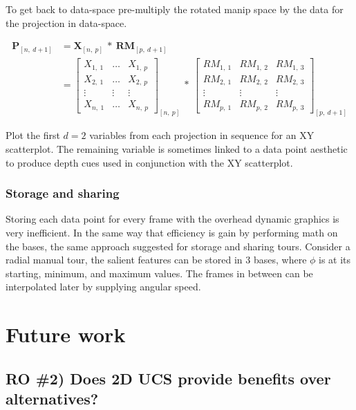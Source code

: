 \documentclass{monashthesis}
\begin{document}
To get back to data-space pre-multiply the rotated manip space by the
data for the projection in data-space.

\begin{align}
  \textbf{P}_{[n,~d+1]}
    &= \textbf{X}_{[n,~p]} ~*~ \textbf{RM}_{[p,~d+1]} \\
    &=
      \begin{bmatrix}
          X_{1,~1} & \dots & X_{1,~p} \\
          X_{2,~1} & \dots & X_{2,~p} \\
          \vdots   & \vdots & \vdots  \\
          X_{n,~1} & \dots & X_{n,~p}
      \end{bmatrix}_{[n,~p]}
      ~*~
      \begin{bmatrix}
        RM_{1,~1} & RM_{1,~2} & RM_{1,~3} \\
        RM_{2,~1} & RM_{2,~2} & RM_{2,~3} \\
        \vdots    & \vdots    & \vdots    \\
        RM_{p,~1} & RM_{p,~2} & RM_{p,~3}
      \end{bmatrix}_{[p,~d+1]}
\end{align}

Plot the first \(d=2\) variables from each projection in sequence for an
XY scatterplot. The remaining variable is sometimes linked to a data
point aesthetic to produce depth cues used in conjunction with the XY
scatterplot.

\subsection{Storage and sharing}\label{storage-and-sharing}

Storing each data point for every frame with the overhead dynamic
graphics is very inefficient. In the same way that efficiency is gain by
performing math on the bases, the same approach suggested for storage
and sharing tours. Consider a radial manual tour, the salient features
can be stored in 3 bases, where \(\phi\) is at its starting, minimum,
and maximum values. The frames in between can be interpolated later by
supplying angular speed.

\chapter{Future work}\label{ch:future_work}

\section{RO \#2) Does 2D UCS provide benefits over
alternatives?}\label{ro-2-does-2d-ucs-provide-benefits-over-alternatives}
\end{document}

